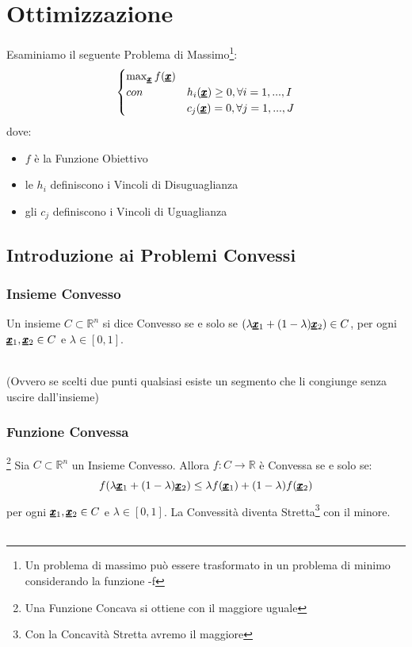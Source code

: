 \chapter{Ottimizzazione}
Esaminiamo il seguente Problema di Massimo\footnote{Un problema di massimo può essere trasformato in un problema di minimo considerando la funzione -f}:
\begin{equation*}
    \begin{cases}
    \max_{\pmb{\underline{x}}} f(\pmb{\underline{x}}) \\
    con &h_i(\pmb{\underline{x}}) \geq 0, \forall i = 1,...,I\\
    & c_j(\pmb{\underline{x}}) = 0, \forall j = 1,..., J
    \end{cases}
\end{equation*}
dove:
\begin{itemize}
    \item $f$ è la Funzione Obiettivo
    \item le $h_i$ definiscono i Vincoli di Disuguaglianza
    \item gli $c_j$ definiscono i Vincoli di Uguaglianza
\end{itemize}

\section{Introduzione ai Problemi Convessi}
\subsection{Insieme Convesso}
Un insieme $C \subset \mathbb{R}^n$ si dice Convesso se e solo se $(\lambda \pmb{\underline{x}}_1 + (1 - \lambda)\pmb{\underline{x}}_2) \in C$, per ogni $\pmb{\underline{x}}_1, \pmb{\underline{x}}_2 \in C$ e $\lambda \in [0,1]$.\\ \\
\begin{center}
    (Ovvero se scelti due punti qualsiasi esiste un segmento che li congiunge senza uscire dall'insieme)
\end{center}

\subsection{Funzione Convessa}
\footnote{Una Funzione Concava si ottiene con il maggiore uguale}
Sia $C \subset \mathbb{R}^n$ un Insieme Convesso.
Allora $f : C \longrightarrow \mathbb{R}$ è Convessa se e solo se:
\begin{equation*}
    f(\lambda \pmb{\underline{x}}_1 + (1 - \lambda)\pmb{\underline{x}}_2) \leq \lambda f(\pmb{\underline{x}}_1) + (1 - \lambda)f(\pmb{\underline{x}}_2)
\end{equation*}
per ogni $\pmb{\underline{x}}_1, \pmb{\underline{x}}_2 \in C$ e $\lambda \in [0,1]$.
La Convessità diventa Stretta\footnote{Con la Concavità Stretta avremo il maggiore} con il minore.\\ \\

